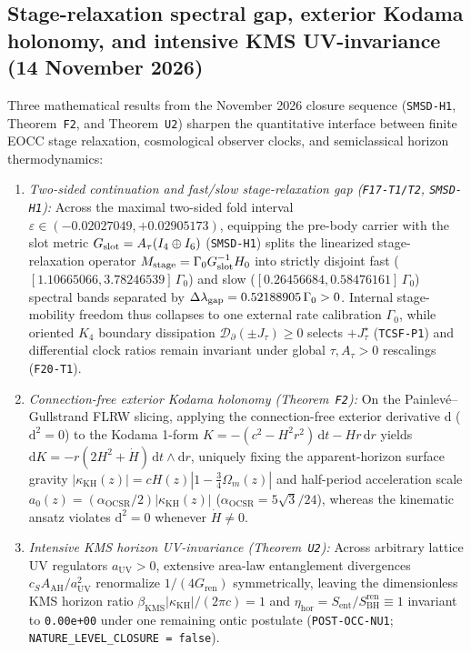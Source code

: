 \documentclass[11pt]{article}
\begin{document}
\subsection{Stage-relaxation spectral gap, exterior Kodama holonomy, and intensive KMS UV-invariance (14 November 2026)}
\label{sec:temporalization-three-pillar-20261114}
Three mathematical results from the November 2026 closure sequence (\texttt{SMSD-H1}, Theorem~\texttt{F2}, and Theorem~\texttt{U2}) sharpen the quantitative interface between finite EOCC stage relaxation, cosmological observer clocks, and semiclassical horizon thermodynamics:
\begin{enumerate}
\item \emph{Two-sided continuation and fast/slow stage-relaxation gap (\texttt{F17-T1/T2}, \texttt{SMSD-H1}):} Across the maximal two-sided fold interval $\varepsilon\in(-0.02027049,+0.02905173)$, equipping the pre-body carrier with the slot metric $G_{\rm slot}=A_\tau(I_4\oplus I_6)$ (\texttt{SMSD-H1}) splits the linearized stage-relaxation operator $M_{\rm stage}=\Gamma_0 G_{\rm slot}^{-1}H_0$ into strictly disjoint fast ($[1.10665066,3.78246539]\,\Gamma_0$) and slow ($[0.26456684,0.58476161]\,\Gamma_0$) spectral bands separated by $\Delta\lambda_{\rm gap}=0.52188905\,\Gamma_0>0$. Internal stage-mobility freedom thus collapses to one external rate calibration $\Gamma_0$, while oriented $K_4$ boundary dissipation $\mathcal{D}_{\partial}(\pm J_\tau)\ge 0$ selects $+J_\tau^\star$ (\texttt{TCSF-P1}) and differential clock ratios remain invariant under global $\tau,A_\tau>0$ rescalings (\texttt{F20-T1}).
\item \emph{Connection-free exterior Kodama holonomy (Theorem~\texttt{F2}):} On the Painlev\'e--Gullstrand FLRW slicing, applying the connection-free exterior derivative $\mathrm{d}$ ($\mathrm{d}^2=0$) to the Kodama 1-form $K=-(c^2-H^2r^2)\,\mathrm{d}t-Hr\,\mathrm{d}r$ yields $\mathrm{d}K=-r(2H^2+\dot{H})\,\mathrm{d}t\wedge\mathrm{d}r$, uniquely fixing the apparent-horizon surface gravity $|\kappa_{\mathrm{KH}}(z)|=cH(z)|1-\frac{3}{4}\Omega_m(z)|$ and half-period acceleration scale $a_0(z)=(\alpha_{\mathrm{OCSR}}/2)|\kappa_{\mathrm{KH}}(z)|$ ($\alpha_{\mathrm{OCSR}}=5\sqrt{3}/24$), whereas the kinematic ansatz violates $\mathrm{d}^2=0$ whenever $\dot{H}\neq 0$.
\item \emph{Intensive KMS horizon UV-invariance (Theorem~\texttt{U2}):} Across arbitrary lattice UV regulators $a_{\mathrm{UV}}>0$, extensive area-law entanglement divergences $c_S A_{\mathrm{AH}}/a_{\mathrm{UV}}^2$ renormalize $1/(4G_{\mathrm{ren}})$ symmetrically, leaving the dimensionless KMS horizon ratio $\beta_{\mathrm{KMS}}|\kappa_{\mathrm{KH}}|/(2\pi c)=1$ and $\eta_{\mathrm{hor}}=S_{\mathrm{ent}}/S_{\mathrm{BH}}^{\mathrm{ren}}\equiv 1$ invariant to \texttt{0.00e+00} under one remaining ontic postulate (\texttt{POST-OCC-NU1}; \texttt{NATURE\_LEVEL\_CLOSURE = false}).
\end{enumerate}
\end{document}

